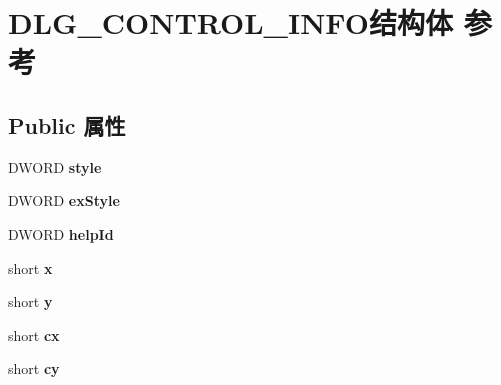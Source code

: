 \hypertarget{struct_d_l_g___c_o_n_t_r_o_l___i_n_f_o}{}\section{D\+L\+G\+\_\+\+C\+O\+N\+T\+R\+O\+L\+\_\+\+I\+N\+F\+O结构体 参考}
\label{struct_d_l_g___c_o_n_t_r_o_l___i_n_f_o}
\subsection*{Public 属性}
\begin{DoxyCompactItemize}
\item 
\mbox{\label{struct_d_l_g___c_o_n_t_r_o_l___i_n_f_o_ace1a506ca68935124afa4a7673d0c214}} 
D\+W\+O\+RD {\bfseries style}
\item 
\mbox{\label{struct_d_l_g___c_o_n_t_r_o_l___i_n_f_o_a01e47ac7507845567bebf2d838cb43b9}} 
D\+W\+O\+RD {\bfseries ex\+Style}
\item 
\mbox{\label{struct_d_l_g___c_o_n_t_r_o_l___i_n_f_o_a54a1c14e9d13c198f8f7cfc62859b62f}} 
D\+W\+O\+RD {\bfseries help\+Id}
\item 
\mbox{\label{struct_d_l_g___c_o_n_t_r_o_l___i_n_f_o_a40fb6bcd4568f46ff08ee2ac81fd2652}} 
short {\bfseries x}
\item 
\mbox{\label{struct_d_l_g___c_o_n_t_r_o_l___i_n_f_o_a810752d5e0f0e1ff009320ec795f3849}} 
short {\bfseries y}
\item 
\mbox{\label{struct_d_l_g___c_o_n_t_r_o_l___i_n_f_o_a9029ada76bbb6d9797d0f9c7fe65bf41}} 
short {\bfseries cx}
\item 
\mbox{\label{struct_d_l_g___c_o_n_t_r_o_l___i_n_f_o_ac7c3cdbd508ca7b7a2c0f2aba279f796}} 
short {\bfseries cy}
\item 
\mbox{\label{struct_d_l_g___c_o_n_t_r_o_l___i_n_f_o_a3685758fd6a8b96f8c649284a14c0b61}} 

\end{DoxyCompactItemize}

